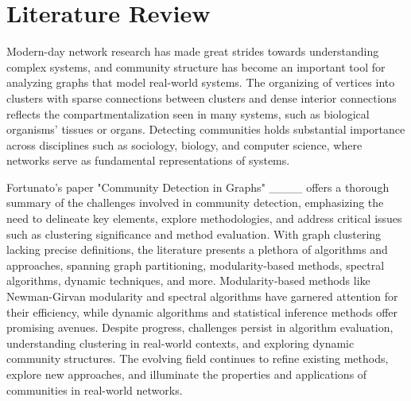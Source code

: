 \section{Literature Review}
Modern-day network research has made great strides towards understanding complex systems, and community structure has become an important tool for analyzing graphs that model real-world systems. The organizing of vertices into clusters with sparse connections between clusters and dense interior connections reflects the compartmentalization seen in many systems, such as biological organisms' tissues or organs. Detecting communities holds substantial importance across disciplines such as sociology, biology, and computer science, where networks serve as fundamental representations of systems.

Fortunato's paper "Community Detection in Graphs" ____ offers a thorough summary of the challenges involved in community detection, emphasizing the need to delineate key elements, explore methodologies, and address critical issues such as clustering significance and method evaluation. With graph clustering lacking precise definitions, the literature presents a plethora of algorithms and approaches, spanning graph partitioning, modularity-based methods, spectral algorithms, dynamic techniques, and more. Modularity-based methods like Newman-Girvan modularity and spectral algorithms have garnered attention for their efficiency, while dynamic algorithms and statistical inference methods offer promising avenues. Despite progress, challenges persist in algorithm evaluation, understanding clustering in real-world contexts, and exploring dynamic community structures. The evolving field continues to refine existing methods, explore new approaches, and illuminate the properties and applications of communities in real-world networks.

